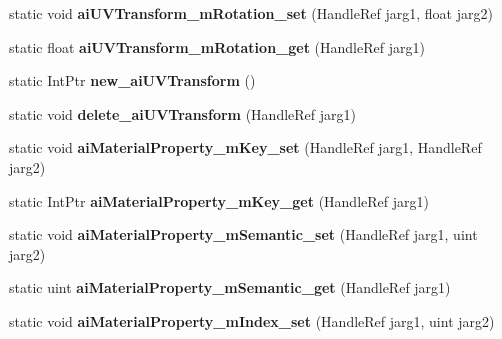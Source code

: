 \begin{DoxyCompactItemize}
\item 
\hypertarget{class_assimp_p_i_n_v_o_k_e_a50297467dcd489b241e88bab03133aa0}{static void {\bfseries ai\+U\+V\+Transform\+\_\+m\+Rotation\+\_\+set} (Handle\+Ref jarg1, float jarg2)}\label{class_assimp_p_i_n_v_o_k_e_a50297467dcd489b241e88bab03133aa0}

\item 
\hypertarget{class_assimp_p_i_n_v_o_k_e_ad046f80188e9a0c6cdd2223c353e0517}{static float {\bfseries ai\+U\+V\+Transform\+\_\+m\+Rotation\+\_\+get} (Handle\+Ref jarg1)}\label{class_assimp_p_i_n_v_o_k_e_ad046f80188e9a0c6cdd2223c353e0517}

\item 
\hypertarget{class_assimp_p_i_n_v_o_k_e_ac0c074f44f0e368895c5d2f70dea3405}{static Int\+Ptr {\bfseries new\+\_\+ai\+U\+V\+Transform} ()}\label{class_assimp_p_i_n_v_o_k_e_ac0c074f44f0e368895c5d2f70dea3405}

\item 
\hypertarget{class_assimp_p_i_n_v_o_k_e_aac60680d6fedc70fe3c595f92d9b6b14}{static void {\bfseries delete\+\_\+ai\+U\+V\+Transform} (Handle\+Ref jarg1)}\label{class_assimp_p_i_n_v_o_k_e_aac60680d6fedc70fe3c595f92d9b6b14}

\item 
\hypertarget{class_assimp_p_i_n_v_o_k_e_a9d6608b4f0773ee16431a78b8ef87dde}{static void {\bfseries ai\+Material\+Property\+\_\+m\+Key\+\_\+set} (Handle\+Ref jarg1, Handle\+Ref jarg2)}\label{class_assimp_p_i_n_v_o_k_e_a9d6608b4f0773ee16431a78b8ef87dde}

\item 
\hypertarget{class_assimp_p_i_n_v_o_k_e_af198fce86b30008f37a228f8dcb0deea}{static Int\+Ptr {\bfseries ai\+Material\+Property\+\_\+m\+Key\+\_\+get} (Handle\+Ref jarg1)}\label{class_assimp_p_i_n_v_o_k_e_af198fce86b30008f37a228f8dcb0deea}

\item 
\hypertarget{class_assimp_p_i_n_v_o_k_e_abb9b60bb2b1d132bb8f466b71f855f62}{static void {\bfseries ai\+Material\+Property\+\_\+m\+Semantic\+\_\+set} (Handle\+Ref jarg1, uint jarg2)}\label{class_assimp_p_i_n_v_o_k_e_abb9b60bb2b1d132bb8f466b71f855f62}

\item 
\hypertarget{class_assimp_p_i_n_v_o_k_e_a98c8eac3d268c34188823a59216ecbe3}{static uint {\bfseries ai\+Material\+Property\+\_\+m\+Semantic\+\_\+get} (Handle\+Ref jarg1)}\label{class_assimp_p_i_n_v_o_k_e_a98c8eac3d268c34188823a59216ecbe3}

\item 
\hypertarget{class_assimp_p_i_n_v_o_k_e_a8532c069e8e790abf3bfdfbaebceace1}{static void {\bfseries ai\+Material\+Property\+\_\+m\+Index\+\_\+set} (Handle\+Ref jarg1, uint jarg2)}\label{class_assimp_p_i_n_v_o_k_e_a8532c069e8e790abf3bfdfbaebceace1}


\end{DoxyCompactItemize}
